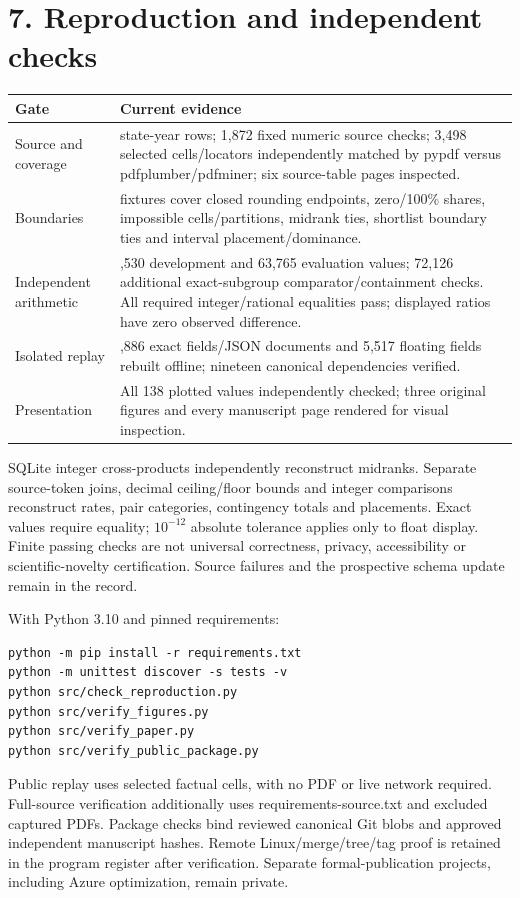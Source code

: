 \documentclass[10pt,letterpaper]{article}
\begin{document}
\clearpage
\section*{7. Reproduction and independent checks}
\begin{tabularx}{\linewidth}{l>{\raggedright\arraybackslash}X}\toprule
Gate & Current evidence\\\midrule
Source and coverage & 153 state-year rows; 1,872 fixed numeric source checks; 3,498 selected cells/locators independently matched by pypdf versus pdfplumber/pdfminer; six source-table pages inspected.\\
Boundaries & 13 fixtures cover closed rounding endpoints, zero/100\% shares, impossible cells/partitions, midrank ties, shortlist boundary ties and interval placement/dominance.\\
Independent arithmetic & 127,530 development and 63,765 evaluation values; 72,126 additional exact-subgroup comparator/containment checks. All required integer/rational equalities pass; displayed ratios have zero observed difference.\\
Isolated replay & 653,886 exact fields/JSON documents and 5,517 floating fields rebuilt offline; nineteen canonical dependencies verified.\\
Presentation & All 138 plotted values independently checked; three original figures and every manuscript page rendered for visual inspection.\\\bottomrule
\end{tabularx}

SQLite integer cross-products independently reconstruct midranks. Separate source-token joins, decimal ceiling/floor bounds and integer comparisons reconstruct rates, pair categories, contingency totals and placements. Exact values require equality; $10^{-12}$ absolute tolerance applies only to float display. Finite passing checks are not universal correctness, privacy, accessibility or scientific-novelty certification. Source failures and the prospective schema update remain in the record.

With Python 3.10 and pinned requirements:
\begin{verbatim}
python -m pip install -r requirements.txt
python -m unittest discover -s tests -v
python src/check_reproduction.py
python src/verify_figures.py
python src/verify_paper.py
python src/verify_public_package.py
\end{verbatim}
Public replay uses selected factual cells, with no PDF or live network required. Full-source verification additionally uses requirements-source.txt and excluded captured PDFs. Package checks bind reviewed canonical Git blobs and approved independent manuscript hashes. Remote Linux/merge/tree/tag proof is retained in the program register after verification. Separate formal-publication projects, including Azure optimization, remain private.
\end{document}
